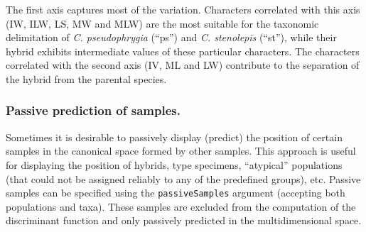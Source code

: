 \documentclass[
]{article}
\newenvironment{Shaded}{\begin{snugshade}}{\end{snugshade}}
\newcommand{\CommentTok}[1]{\textcolor[rgb]{0.56,0.35,0.01}{\textit{#1}}}
\newcommand{\NormalTok}[1]{#1}
\newcommand{\OperatorTok}[1]{\textcolor[rgb]{0.81,0.36,0.00}{\textbf{#1}}}
\begin{document}
\begin{Shaded}
\end{Shaded}

The first axis captures most of the variation. Characters correlated
with this axis (IW, ILW, LS, MW and MLW) are the most suitable for the
taxonomic delimitation of \emph{C. pseudophrygia} (``ps'') and \emph{C.
stenolepis} (``st''), while their hybrid exhibits intermediate values of
these particular characters. The characters correlated with the second
axis (IV, ML and LW) contribute to the separation of the hybrid from the
parental species.

\hypertarget{passive-prediction-of-samples.}{%
\subsubsection{Passive prediction of
samples.}\label{passive-prediction-of-samples.}}

Sometimes it is desirable to passively display (predict) the position of
certain samples in the canonical space formed by other samples. This
approach is useful for displaying the position of hybrids, type
specimens, ``atypical'' populations (that could not be assigned reliably
to any of the predefined groups), etc. Passive samples can be specified
using the \texttt{passiveSamples} argument (accepting both populations
and taxa). These samples are excluded from the computation of the
discriminant function and only passively predicted in the
multidimensional space.
\end{document}
